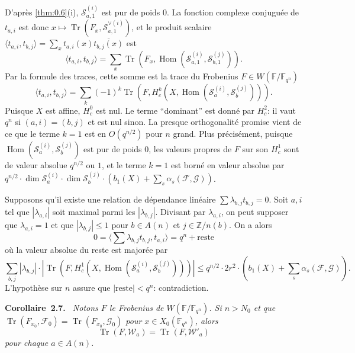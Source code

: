 \documentclass[11pt,a4paper]{article}
\makeatletter
\theoremstyle{plain}
\theoremstyle{definition}
\newenvironment{manualblock}[4]{%
  \par\medskip\noindent\textbf{#1~#2#3.}\def\@currentlabel{#2}\label{#4}\itshape\ }{\par\normalfont\medskip}
\DeclareMathOperator{\Hom}{Hom}
\DeclareMathOperator{\tr}{Tr}
\makeatother
\begin{document}
D'apr\`es \ref{thm:0.6}(i), $\mathcal{S}_{a,1}^{(i)}$ est pur de poids $0$. La fonction complexe conjugu\'ee de $t_{a,i}$ est donc $x \mapsto \tr(F_x, \mathcal{S}_{a,1}^{\vee(i)})$, et le produit scalaire $\langle t_{a,i}, t_{b,j} \rangle = \sum_x t_{a,i}(x) \overline{t_{b,j}(x)}$ est
\[
\langle t_{a,i}, t_{b,j} \rangle = \sum_x \tr(F_x, \Hom(\mathcal{S}_{a,1}^{(i)}, \mathcal{S}_{b,1}^{(j)})).
\]
Par la formule des traces, cette somme est la trace du Frobenius $F \in W(\mathbb{F}/\mathbb{F}_{q^n})$
\begin{equation}\label{eq:2.6.1}
\langle t_{a,i}, t_{b,j} \rangle = \sum_k (-1)^k \tr(F, H_c^k(X, \Hom(\mathcal{S}_a^{(i)}, \mathcal{S}_b^{(j)}))).
\end{equation}
Puisque $X$ est affine, $H_c^0$ est nul. Le terme ``dominant'' est donn\'e par $H_c^2$: il vaut $q^n$ si $(a,i) = (b,j)$ et est nul sinon. La presque orthogonalit\'e promise vient de ce que le terme $k=1$ est en $O(q^{n/2})$ pour $n$ grand. Plus pr\'ecis\'ement, puisque $\Hom(\mathcal{S}_a^{(i)}, \mathcal{S}_b^{(j)})$ est pur de poids $0$, les valeurs propres de $F$ sur son $H_c^1$ sont de valeur absolue $q^{n/2}$ ou $1$, et le terme $k=1$ est born\'e en valeur absolue par $q^{n/2} \cdot \dim \mathcal{S}_a^{(i)} \cdot \dim \mathcal{S}_b^{(j)} \cdot (b_1(X) + \sum_s \alpha_s(\mathcal{F}, \mathcal{G}))$.

Supposons qu'il existe une relation de d\'ependance lin\'eaire $\sum \lambda_{b,j} t_{b,j} = 0$. Soit $a,i$ tel que $|\lambda_{a,i}|$ soit maximal parmi les $|\lambda_{b,j}|$. Divisant par $\lambda_{a,i}$, on peut supposer que $\lambda_{a,i} = 1$ et que $|\lambda_{b,j}| \leq 1$ pour $b \in A(n)$ et $j \in \mathbb{Z}/n(b)$. On a alors
\[
0 = \langle \sum \lambda_{b,j} t_{b,j}, t_{a,i} \rangle = q^n + \text{reste}
\]
o\`u la valeur absolue du reste est major\'ee par
\[
\sum_{b,j} |\lambda_{b,j}| \cdot |\tr(F, H_c^1(X, \Hom(\mathcal{S}_a^{(i)}, \mathcal{S}_b^{(j)})))| \leq q^{n/2} \cdot 2r^2 \cdot (b_1(X) + \sum_s \alpha_s(\mathcal{F}, \mathcal{G})).
\]
L'hypoth\`ese sur $n$ assure que $|\text{reste}| < q^n$: contradiction.

\begin{manualblock}{Corollaire}{2.7}{}{cor:2.7}
Notons $F$ le Frobenius de $W(\mathbb{F}/\mathbb{F}_{q^n})$. Si $n > N_0$ et que $\tr(F_{x_0}, \mathcal{F}_0) = \tr(F_{x_0}, \mathcal{G}_0)$ pour $x \in X_0(\mathbb{F}_{q^n})$, alors
\[
\tr(F, \mathcal{W}_a) = \tr(F, \mathcal{W}'_a)
\]
pour chaque $a \in A(n)$.
\end{manualblock}
\end{document}
